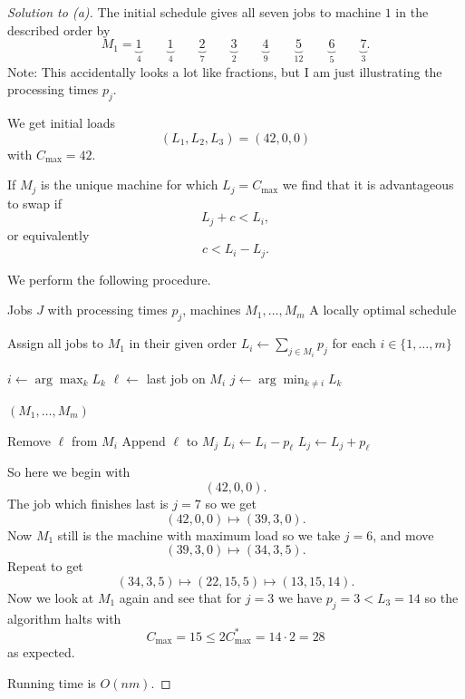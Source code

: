\documentclass[11pt]{article}
\begin{document}
\begin{proof}[Solution to (a)]
    The initial schedule gives all seven jobs to 
    machine $1$ in the described order by 
    \[
        M_1 = \underbrace{1}_{4}
        \qquad 
        \underbrace{1}_{4}
        \qquad 
        \underbrace{2}_{7}
        \qquad 
        \underbrace{3}_{2}
        \qquad 
        \underbrace{4}_{9}
        \qquad 
        \underbrace{5}_{12}
        \qquad 
        \underbrace{6}_{5}
        \qquad 
        \underbrace{7}_{3}.
    \]
    Note: This accidentally looks a lot like fractions, but 
    I am just illustrating the processing times $p_j$. 

    We get initial loads 
    \[
        (L_1,L_2,L_3) = (42,0,0)
    \]
    with $C_{\max} = 42$. 

    If $M_j$ is the unique machine for which 
    $L_j = C_{\max}$ we find that it is advantageous 
    to swap if 
    \[
        L_j + c < L_i, 
    \]
    or equivalently 
    \[
        c < L_i - L_j.
    \]

    We perform the following procedure. 

    \begin{algorithmic}[1]
        \Require Jobs $J$ with processing times $p_j$,
                 machines $M_1,\ldots,M_m$
        \Ensure A locally optimal schedule

        \State Assign all jobs to $M_1$ in their given order
        \State $L_i \gets \sum_{j \in M_i} p_j$
               for each $i \in \{1,\ldots,m\}$

            \State $i \gets \arg\max_{k} L_k$
            \State $\ell \gets$ last job on $M_i$
            \State $j \gets \arg\min_{k \neq i} L_k$

                \State \Return $(M_1,\ldots,M_m)$
            \EndIf

            \State Remove $\ell$ from $M_i$
            \State Append $\ell$ to $M_j$
            \State $L_i \gets L_i - p_\ell$
            \State $L_j \gets L_j + p_\ell$
        \EndWhile
    \end{algorithmic}

    So here we begin with 
    \[
        (42,0,0). 
    \]
    The job which finishes last is $j = 7$ so we get 
    \[
        (42,0,0) \mapsto (39,3,0). 
    \]
    Now $M_1$ still is the machine with maximum load 
    so we take $j = 6$, and move 
    \[
        (39,3,0) \mapsto (34, 3, 5). 
    \]
    Repeat to get 
    \[
        (34,3,5) \mapsto (22,15,5) 
        \mapsto (13,15,14). 
    \]
    Now we look at $M_1$ again and see that 
    for $j = 3$ we have $p_j = 3 < L_3 = 14$ so 
    the algorithm halts with 
    \[
        C_{\max} = 15 \leq 2C^*_{\max} = 
        14 \cdot 2 = 28
    \]
    as expected. 

    Running time is $O(nm)$.

\end{proof}
\end{document}
